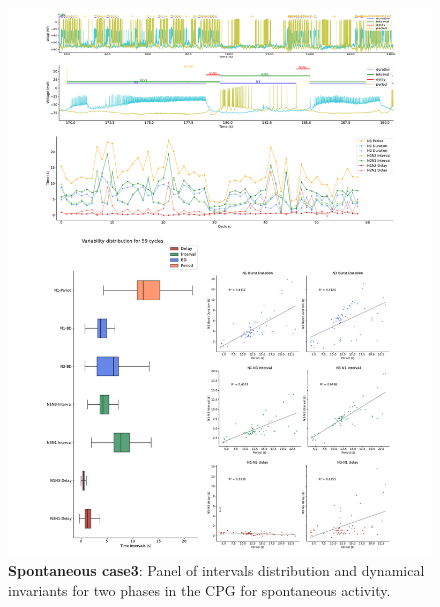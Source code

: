 \begin{figure}[htbp]
	\centering
	\includegraphics[width=1.1\textwidth]{./invariants/data/SUSSEX/prep3/images/2phases/panel_with_intervals.pdf}
	\caption{\textbf{Spontaneous case3}: Panel of intervals distribution and dynamical invariants for two phases in the CPG for spontaneous activity.}
	\label{fig:prep3 2phases invariants}
\end{figure}

